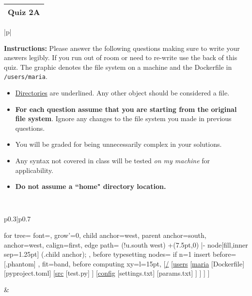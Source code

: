 \documentclass[11pt]{article}
\begin{document}
\begin{tabularx}{\textwidth}{X}
\textbf{Quiz 2A} \\
\hline
\end{tabularx}


\begin{table}[h]
\centering
{} %
\begin{tabular}{|p{\textwidth}|}
\hline
\begin{minipage}[t]{\textwidth}
\vspace{0pt}  %
\noindent \textbf{Instructions:} Please answer the following questions making sure to write your answers legibly. If you run out of room or need to re-write use the back of this quiz. The graphic denotes the file system on a machine and the Dockerfile in \texttt{/users/maria}.
\begin{itemize}
    \item \underline{Directories} are underlined. Any other object should be considered a file.
    \item \textbf{For each question assume that you are starting from the original file system}. Ignore any changes to the file system you made in previous questions.
    \item You will be graded for being unnecessarily complex in your solutions. 
    \item Any syntax not covered in class will be tested \emph{on my machine} for applicability.
    \item \textbf{Do not assume a ``home" directory location.}
\end{itemize}


\end{minipage} \\
\hline
\begin{tabular}{p{0.3\textwidth}|p{0.7\textwidth}}
\begin{minipage}[t]{\linewidth}
\vspace{0pt}  %
\begin{forest}
  for tree={
    font=\ttfamily,
    grow'=0,
    child anchor=west,
    parent anchor=south,
    anchor=west,
    calign=first,
    edge path={
      \noexpand{}
      (!u.south west) +(7.5pt,0) |- node[fill,inner sep=1.25pt] {} (.child anchor);
    },
    before typesetting nodes={
      if n=1
        {insert before={[,phantom]}}
        {}
    },
    fit=band,
    before computing xy={l=15pt},
  }
[\underline{/}
  [\underline{users}
    [\underline{maria}
      [Dockerfile]
      [pyproject.toml]
      [\underline{src}
        [test.py]
      ]
      [\underline{config}
        [settings.txt]
        [params.txt]
      ]
    ]
  ]
]
\end{forest}
\end{minipage}
&
\begin{minipage}[t]{\linewidth}
\vspace{0pt}  %


\end{minipage}
\end{tabular}
\end{tabular}
\end{table}
\end{document}
